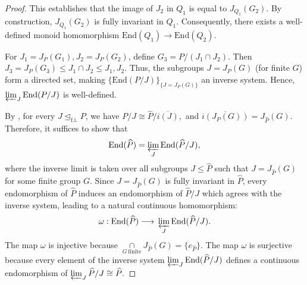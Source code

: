 \documentclass[12pt]{amsart}
\begin{document}
\begin{proof}
    This establishes that the image of $J_2$ in $Q_1$ is equal to $J_{Q_1}(G_2).$ By construction, $J_{Q_1}(G_2)$ is fully invariant in $Q_1$. Consequently, there exists a well-defined monoid homomorphism $\mathrm{End}(Q_1) \to \mathrm{End}(Q_2).$ 

    For $J_1 = J_P(G_1), J_2 = J_P(G_2)$, define $G_3 = P/(J_1 \cap J_2)$. Then $J_3 = J_P(G_3) \leq J_1 \cap J_2 \leq J_1, J_2$. Thus, the subgroups $J = J_P(G)$ (for finite $G$) form a directed set, making $\{\mathrm{End}(P/J)\}_{\{J = J_P(G)\}}$ an inverse system. Hence, $\varprojlim_{J} \mathrm{End}(P/J)$ is well-defined.
    

    By \cite[Proposition 3.2.2]{ribes2000profinite}, for every $J \unlhd_{\mathrm{f.i.}} P$, we have $P/J \cong \widehat{P}/\overline{i(J)},$ and $\overline{i(J_P(G))} = J_{\widehat{P}}(G).$ Therefore, it suffices to show that $$\mathrm{End} (\widehat{P}) = \varprojlim_{J} \mathrm{End}(\widehat{P}/J),$$
    where the inverse limit is taken over all subgroups $J \leq \widehat{P}$ such that $J = J_{\widehat{P}}(G)$ for some finite group $G.$ Since $J = J_{\widehat{P}}(G)$ is fully invariant in $\widehat{P}$, every endomorphism of $\widehat{P}$ induces an endomorphism of $\widehat{P}/J$ which agrees with the inverse system, leading to a natural continuous homomorphism: $$\omega: \mathrm{End} (\widehat{P}) \longrightarrow \underset{}{}\varprojlim_{J} \mathrm{End}(\widehat{P}/J).$$
    The map $\omega$ is injective because $\underset{G\,\mathrm{finite}}{\cap} J_{\widehat{P}}(G) = \{e_{\widehat{P}}\}.$ The map $\omega$ is surjective because every element of the inverse system $\varprojlim_{J} \mathrm{End}(\widehat{P}/J)$ defines a continuous endomorphism of $\varprojlim_{J} \widehat{P}/J \cong \widehat{P}.$
\end{proof}
\end{document}
